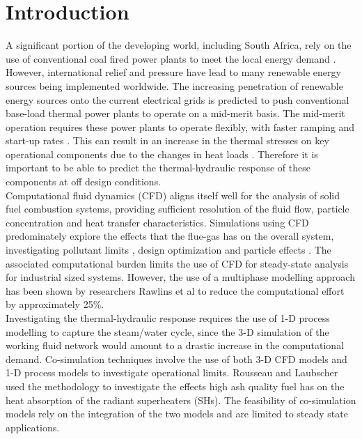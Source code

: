 \documentclass[a4paper,fleqn]{cas-sc}
\begin{document}
\section{Introduction}\label{intro}
A significant portion of the developing world, including South Africa, rely on the use of conventional coal fired power plants to meet the local energy demand \cite{Rousseau2020}. However, international relief and pressure have lead to many renewable energy sources being implemented worldwide. The increasing penetration of renewable energy sources onto the current electrical grids is predicted to push conventional base-load thermal power plants to operate on a mid-merit basis. The mid-merit operation requires these power plants to operate flexibly, with faster ramping and start-up rates \cite{Safdarnejad2019}. This can result in an increase in the thermal stresses on key operational components due to the changes in heat loads \cite{Modlinski2019}. Therefore it is important to be able to predict the thermal-hydraulic response of these components at off design conditions.\\

Computational fluid dynamics (CFD) aligns itself well for the analysis of solid fuel combustion systems, providing sufficient resolution of the fluid flow, particle concentration and heat transfer characteristics. Simulations using CFD predominately explore the effects that the flue-gas has on the overall system, investigating pollutant limits \cite{Liu2021}, design optimization \cite{dugum2019, Gu2020} and particle effects \cite{Laubscher2020}. The associated computational burden limits the use of CFD for steady-state analysis for industrial sized systems. However, the use of a multiphase modelling approach has been shown by researchers Rawlins et al \cite{Rawlins2022} to reduce the computational effort by approximately 25\%.\\

Investigating the thermal-hydraulic response requires the use of 1-D process modelling to capture the steam/water cycle, since the 3-D simulation of the working fluid network would amount to a drastic increase in the computational demand. Co-simulation techniques involve the use of both 3-D CFD models and 1-D process models to investigate operational limits. Rousseau and Laubscher \cite{Rousseau2020} used the methodology to investigate the effects high ash quality fuel has on the heat absorption of the radiant superheaters (SHs). The feasibility of co-simulation models rely on the integration of the two models and are limited to steady state applications.\\
\end{document}
